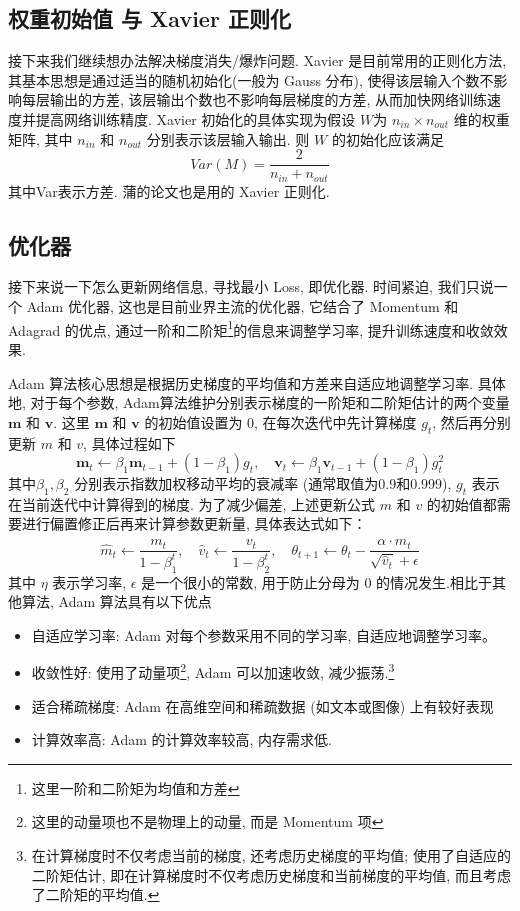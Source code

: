\subsection{权重初始值 与 Xavier 正则化}
接下来我们继续想办法解决梯度消失/爆炸问题. Xavier 是目前常用的正则化方法, 其基本思想是通过适当的随机初始化(一般为 Gauss 分布), 使得该层输入个数不影响每层输出的方差, 该层输出个数也不影响每层梯度的方差, 从而加快网络训练速度并提高网络训练精度. Xavier 初始化的具体实现为假设 $ W $为 $ n_{in} \times n_{out} $ 维的权重矩阵, 其中 $ n_{in}$  和 $ n_{out} $ 分别表示该层输入输出. 则 $ W $ 的初始化应该满足
\begin{equation}
    Var(M) = \frac{2}{n_{in}+n_{out}}
\end{equation}
其中Var表示方差. 蒲的论文也是用的 Xavier 正则化.
\subsection{优化器}
接下来说一下怎么更新网络信息, 寻找最小 Loss, 即优化器. 时间紧迫, 我们只说一个 Adam\cite{Adam} 优化器, 这也是目前业界主流的优化器, 它结合了 Momentum 和 Adagrad 的优点, 通过一阶和二阶矩\footnote{这里一阶和二阶矩为均值和方差}的信息来调整学习率, 提升训练速度和收敛效果. 

Adam 算法核心思想是根据历史梯度的平均值和方差来自适应地调整学习率. 具体地, 对于每个参数, Adam算法维护分别表示梯度的一阶矩和二阶矩估计的两个变量 $ \textbf{m} $ 和 $ \textbf{v} $. 这里 $ \textbf{m} $ 和 $ \textbf{v} $ 的初始值设置为 0, 在每次迭代中先计算梯度 $ g_{t} $, 然后再分别更新 $ m $ 和 $ v$, 具体过程如下
\begin{equation}
    \textbf{m}_t \leftarrow \beta_{1} \textbf{m}_{t-1} + (1-\beta_1)g_t, \quad \textbf{v}_t \leftarrow \beta_{1} \textbf{v}_{t-1} + (1-\beta_1)g_{t}^{2}
\end{equation}
其中$ \beta_1, \beta_2 $ 分别表示指数加权移动平均的衰减率 (通常取值为0.9和0.999), $ g_t $ 表示在当前迭代中计算得到的梯度. 为了减少偏差, 上述更新公式 $ m $ 和 $ v $ 的初始值都需要进行偏置修正后再来计算参数更新量, 具体表达式如下：
\begin{equation}
    \hat{m}_t \leftarrow \frac{m_t}{1 - \beta_{1}^t}, \quad 
    \hat{v}_t \leftarrow \frac{v_t}{1 - \beta_{2}^t}, \quad
    \theta_{t+1} \leftarrow \theta_t - \frac{\alpha \cdot \hat{m}_t}{\sqrt{\hat{v}_t} + \epsilon}
\end{equation}
其中 $ \eta $ 表示学习率, $ \epsilon $ 是一个很小的常数, 用于防止分母为 0 的情况发生.相比于其他算法, Adam 算法具有以下优点
\begin{itemize}
    \item 自适应学习率: Adam 对每个参数采用不同的学习率, 自适应地调整学习率。
    \item 收敛性好: 使用了动量项\footnote{这里的动量项也不是物理上的动量, 而是 Momentum 项}, Adam 可以加速收敛, 减少振荡.\footnote{在计算梯度时不仅考虑当前的梯度, 还考虑历史梯度的平均值; 使用了自适应的二阶矩估计, 即在计算梯度时不仅考虑历史梯度和当前梯度的平均值, 而且考虑了二阶矩的平均值.}
    \item 适合稀疏梯度: Adam 在高维空间和稀疏数据 (如文本或图像) 上有较好表现
    \item 计算效率高: Adam 的计算效率较高, 内存需求低. 
\end{itemize}